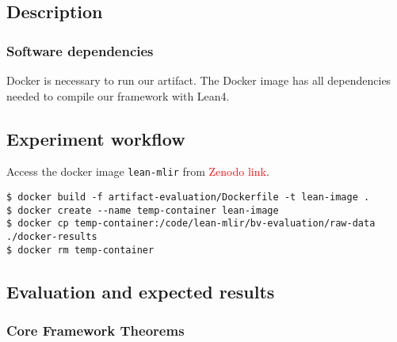 \documentclass{sigplanconf}
\begin{document}
\subsection{Description}

\subsubsection{Software dependencies}

Docker is necessary to run our artifact.
The Docker image has all dependencies needed to compile our framework with Lean4.



\subsection{Experiment workflow}

Access the docker image \texttt{lean-mlir} from
\textcolor{red}{Zenodo link}.

\begin{verbatim}
$ docker build -f artifact-evaluation/Dockerfile -t lean-image .
$ docker create --name temp-container lean-image
$ docker cp temp-container:/code/lean-mlir/bv-evaluation/raw-data ./docker-results
$ docker rm temp-container
\end{verbatim}



\subsection{Evaluation and expected results}


\subsubsection{Core Framework Theorems}
\end{document}
